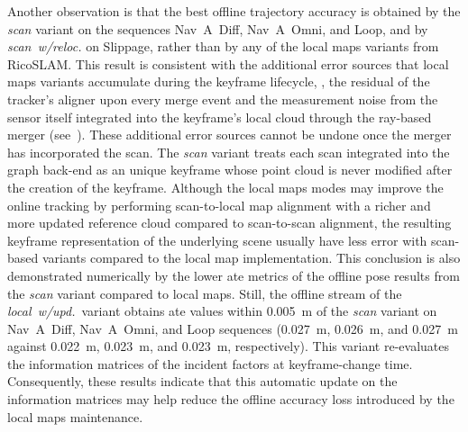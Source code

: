 Another observation is that the best offline trajectory accuracy is obtained by
the \emph{scan} variant on the sequences Nav~A~Diff, Nav~A~Omni, and Loop, and
by \emph{scan~w/reloc.} on Slippage, rather than by any of the local maps
variants from RicoSLAM. This result is consistent with the additional error
sources that local maps variants accumulate during the keyframe lifecycle, \eg,
the residual of the tracker's aligner upon every merge event and the measurement
noise from the sensor itself integrated into the keyframe's local cloud through
the ray-based merger (see~). These additional
error sources cannot be undone once the merger has incorporated the scan.
The \emph{scan} variant treats each scan integrated into the graph back-end as
an unique keyframe whose point cloud is never modified after the creation of the
keyframe. Although the local maps modes may improve the online tracking by
performing scan-to-local map alignment with a richer and more updated reference
cloud compared to scan-to-scan alignment, the resulting keyframe representation
of the underlying scene usually have less error with scan-based variants
compared to the local map implementation. This conclusion is also demonstrated
numerically by the lower \gls{ate} metrics of the offline pose results from the
\emph{scan} variant compared to local maps.
Still, the offline stream of the \emph{local~w/upd.}\ variant obtains
\gls{ate} values within \SI{0.005}{\metre} of the \emph{scan} variant
on Nav~A~Diff, Nav~A~Omni, and Loop sequences (\SI{0.027}{\metre},
\SI{0.026}{\metre}, and \SI{0.027}{\metre} against \SI{0.022}{\metre},
\SI{0.023}{\metre}, and \SI{0.023}{\metre}, respectively).
This variant re-evaluates the information matrices of the incident factors at
keyframe-change time. Consequently, these results indicate that this automatic
update on the information matrices may help reduce the offline accuracy loss
introduced by the local maps maintenance.

